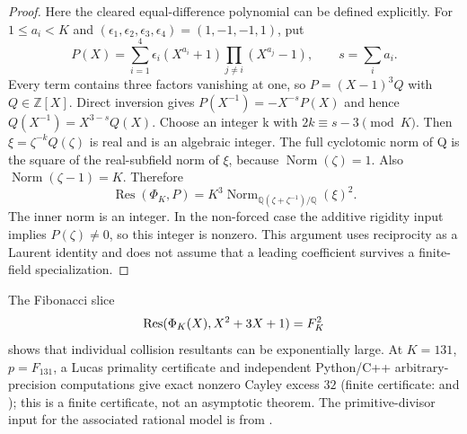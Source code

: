 \begin{proof}
Here the cleared equal-difference polynomial can be defined explicitly.
For $1\leq a_i<K$ and $(\epsilon_1,\epsilon_2,\epsilon_3,\epsilon_4)
=(1,-1,-1,1)$, put
\[
 P(X)=\sum_{i=1}^4\epsilon_i(X^{a_i}+1)
                         \prod_{j\ne i}(X^{a_j}-1),\qquad s=\sum_i a_i.
\]
Every term contains three factors vanishing at one, so
$P=(X-1)^3Q$ with $Q\in\mathbb Z[X]$. Direct inversion gives
$P(X^{-1})=-X^{-s}P(X)$ and hence $Q(X^{-1})=X^{3-s}Q(X)$.
Choose an integer k with $2k\equiv s-3\pmod K$. Then
$\xi=\zeta^{-k}Q(\zeta)$ is real and is an algebraic integer.
The full cyclotomic norm of Q is the square of the real-subfield norm
of $\xi$, because $\operatorname{Norm}(\zeta)=1$.
Also $\operatorname{Norm}(\zeta-1)=K$. Therefore
\[
 \operatorname{Res}(\Phi_K,P)
       =K^3\operatorname{Norm}_{\mathbb Q(\zeta+\zeta^{-1})/\mathbb Q}(\xi)^2.
\]
The inner norm is an integer. In the non-forced case the additive rigidity
input implies $P(\zeta)\ne0$, so this integer is nonzero. This argument
uses reciprocity as a Laurent identity and does not assume that a leading
coefficient survives a finite-field specialization.
\end{proof}


The Fibonacci slice
\[
\operatorname{Res}(\Phi_K(X),X^2+3X+1)=F_K^2
\]
shows that individual collision resultants can be exponentially large.  At
$K=131$, $p=F_{131}$, a Lucas primality certificate and independent Python/C++
arbitrary-precision computations give exact nonzero Cayley excess $32$
(finite certificate:
 and
); this is
a finite certificate, not an asymptotic theorem.  The primitive-divisor input
for the associated rational model is from \cite{Yabuta2001}.

